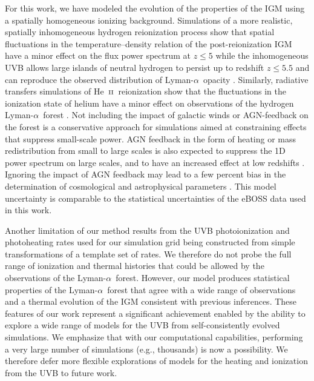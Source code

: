 \documentclass[twocolumn]{aastex62}
\newcommand\Lya{Lyman-$\alpha$}
\def\HeII{\hbox{He~$\scriptstyle\rm II$}}
\begin{document}
For this work, we have modeled the evolution of the properties of the IGM using a spatially homogeneous ionizing
background. Simulations of a more realistic, spatially inhomogeneous hydrogen reionization
process show that spatial fluctuations in the temperature–density relation of the post-reionization
IGM have a minor effect on the flux power spectrum \citep{Keating+2018} at $z\leq 5$ 
while the inhomogeneous UVB allows large islands of neutral hydrogen to persist up to redshift $z \leq 5.5$ and can reproduce 
the observed distribution of \Lya\ opacity \citep{kulkarni2019}. 
Similarly, radiative transfers simulations of
\HeII\ reionization show that the fluctuations in the ionization state of helium have a minor effect on observations of the hydrogen 
\Lya\ forest \citep{laplante2017a, Upton-Sanderbeck+2020}. Not including the impact of galactic winds or AGN-feedback on the forest 
is a conservative approach for simulations aimed at constraining effects that suppress small-scale power. AGN feedback in the form 
of heating or mass redistribution from small to large scales is also expected to suppress the 1D power spectrum on large scales, 
and to have an increased effect at low redshifts \citep{Viel+2013}. Ignoring the impact of AGN feedback may lead to a few 
percent bias in the determination of cosmological and astrophysical parameters \citep{Chabanier+2020}. This model uncertainty is 
comparable to the statistical uncertainties of the eBOSS data used in this work.          


Another limitation of our method results from the UVB photoionization and photoheating rates
used for our simulation grid being constructed from simple transformations of a template set of rates.
We therefore do not probe the full 
range of ionization and thermal histories that could be allowed by the observations of 
the \Lya\ forest.
However, our model produces statistical properties 
of the \Lya\ forest that agree 
with a wide range of observations and a thermal evolution of the IGM consistent with previous inferences.
These features of our work represent
a significant achievement enabled by the ability to
explore a wide range of models for the UVB from self-consistently evolved simulations.
We emphasize that with our computational capabilities,
performing a very large number of simulations (e.g., thousands) is now a possibility. We therefore defer more 
flexible explorations of models for the heating and ionization from the UVB to future work.  
\end{document}
